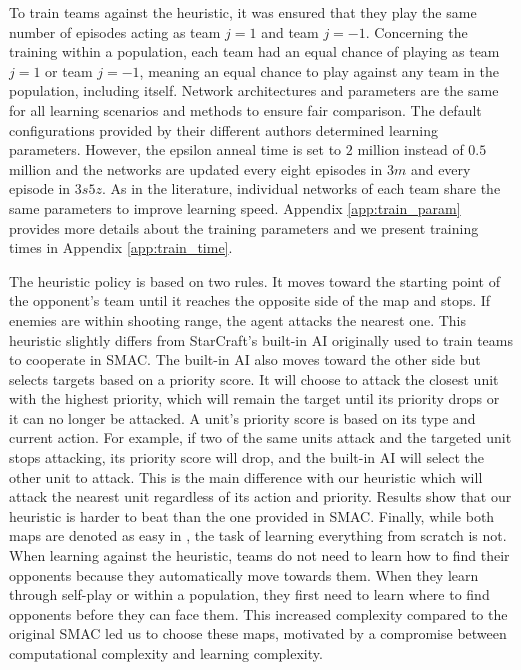 To train teams against the heuristic, it was ensured that they play the same number of episodes acting as team $j=1$ and team $j=-1$.
Concerning the training within a population, each team had an equal chance of playing as team $j=1$ or team $j=-1$, meaning an equal chance to play against any team in the population, including itself.
Network architectures and parameters are the same for all learning scenarios and methods to ensure fair comparison.
The default configurations provided by their different authors \citep{Rashid2018,Mahajan2019MAVEN:Exploration,leroy2020qvmix} determined learning parameters.
However, the epsilon anneal time is set to $2$ million instead of $0.5$ million and the networks are updated every eight episodes in $3m$ and every episode in $3s5z$.
As in the literature, individual networks of each team share the same parameters to improve learning speed. 
Appendix \ref{app:train_param} provides more details about the training parameters and we present training times in Appendix \ref{app:train_time}.

The heuristic policy is based on two rules.
It moves toward the starting point of the opponent's team until it reaches the opposite side of the map and stops.
If enemies are within shooting range, the agent attacks the nearest one.
This heuristic slightly differs from StarCraft's built-in AI originally used to train teams to cooperate in SMAC.
The built-in AI also moves toward the other side but selects targets based on a priority score.
It will choose to attack the closest unit with the highest priority, which will remain the target until its priority drops or it can no longer be attacked.
A unit's priority score is based on its type and current action.
For example, if two of the same units attack and the targeted unit stops attacking, its priority score will drop, and the built-in AI will select the other unit to attack.
This is the main difference with our heuristic which will attack the nearest unit regardless of its action and priority.
Results show that our heuristic is harder to beat than the one provided in SMAC.
Finally, while both maps are denoted as easy in \citep{samvelyan2019starcraft}, the task of learning everything from scratch is not.
When learning against the heuristic, teams do not need to learn how to find their opponents because they automatically move towards them.
When they learn through self-play or within a population, they first need to learn where to find opponents before they can face them.
This increased complexity compared to the original SMAC led us to choose these maps, motivated by a compromise between computational complexity and learning complexity.

